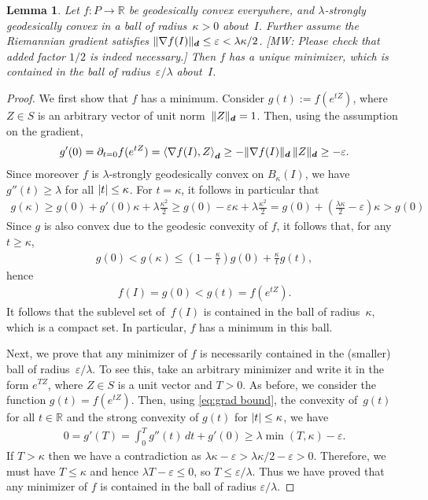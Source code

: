 \documentclass{article}
\newtheorem{lemma}[theorem]{Lemma}
\DeclarePairedDelimiter{\abs}{\lvert}{\rvert}
\DeclarePairedDelimiter{\norm}{\lVert}{\rVert}
\newcommand{\R}{{\mathbb{R}}}
\renewcommand{\vec}{\bm}
\newcommand\eps{\varepsilon}
\newcommand{\MW}[1]{{\color{red}[MW: #1]}}
\begin{document}
\begin{lemma}\label{lem:convex-ball}
Let $f\colon P\to \R$ be geodesically convex everywhere, and $\lambda$-strongly geodesically convex in a ball of radius~$\kappa>0$ about~$I$.
Further assume the Riemannian gradient satisfies $\norm{\nabla f(I)}_{\vec d} \leq \eps < \lambda \kappa / 2$. \MW{Please check that added factor $1/2$ is indeed necessary.}
Then $f$ has a unique minimizer, which is contained in the ball of radius~$\eps/\lambda$ about~$I$.
\end{lemma}
\begin{proof}
We first show that $f$ has a minimum.
Consider $g(t) := f(e^{t Z})$, where $Z\in S$ is an arbitrary vector of unit norm~$\norm Z_{\vec d} = 1$.
Then, using the assumption on the gradient,
\begin{align}\label{eq:grad bound}
  g'(0)
= \partial_{t=0} f(e^{t Z})
= \braket{\nabla f(I), Z}_{\vec d}
\geq -\norm{\nabla f(I)}_{\vec d} \, \norm Z_{\vec d}
\geq -\eps.
\end{align}
Since moreover $f$ is $\lambda$-strongly geodesically convex on $B_\kappa(I)$, we have $g''(t) \geq \lambda$ for all $\abs t\leq\kappa$.
For $t=\kappa$, it follows in particular that
\begin{align*}
  g(\kappa)
\geq g(0) + g'(0) \kappa + \lambda \frac{\kappa^2}2
\geq g(0) - \eps \kappa + \lambda \frac{\kappa^2}2
= g(0) + \left( \frac{\lambda\kappa}2 - \eps \right) \kappa
> g(0)
\end{align*}
Since $g$ is also convex due to the geodesic convexity of $f$, it follows that, for any~$t \geq \kappa$,
\begin{align*}
  g(0) < g(\kappa) \leq \left( 1-\frac{\kappa}t \right) g(0) + \frac{\kappa}t g(t),
\end{align*}
hence
\begin{align*}
  f(I) = g(0) < g(t) = f(e^{tZ}).
\end{align*}
It follows that the sublevel set of~$f(I)$ is contained in the ball of radius~$\kappa$, which is a compact set.
In particular, $f$ has a minimum in this ball.

Next, we prove that any minimizer of $f$ is necessarily contained in the (smaller) ball of radius~$\eps/\lambda$.
To see this, take an arbitrary minimizer and write it in the form $e^{TZ}$, where $Z\in S$ is a unit vector and $T>0$.
As before, we consider the function $g(t) = f(e^{t Z})$.
Then, using \cref{eq:grad bound}, the convexity of~$g(t)$ for all $t\in\R$ and the strong convexity of $g(t)$ for $\abs t \leq \kappa$, we have
\begin{align*}
  0 = g'(T) = \int_0^T g''(t) \, dt + g'(0) \geq \lambda \min(T, \kappa) - \eps.
\end{align*}
If $T>\kappa$ then we have a contradiction as $\lambda\kappa - \eps > \lambda\kappa/2 - \eps > 0$.
Therefore, we must have $T\leq\kappa$ and hence $\lambda T - \eps \leq 0$, so $T \leq \eps/\lambda$.
Thus we have proved that any minimizer of $f$ is contained in the ball of radius $\eps/\lambda$.


\end{proof}
\end{document}
